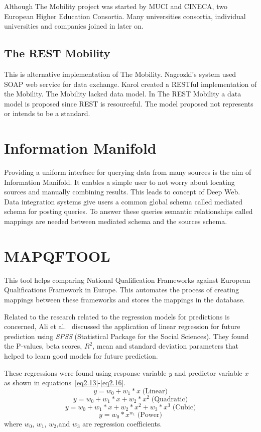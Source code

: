 \documentclass[12pt,a4paper,oneside]{book} %
\begin{document}
    Although The Mobility project was started by MUCI and CINECA, two European Higher Education Consortia. Many universities consortia, individual universities and companies joined in later on.

    \subsection{The REST Mobility}
    This is alternative implementation of The Mobility. Nagrozki's system used SOAP web service for data exchange. Karol created a RESTful implementation of the Mobility. The Mobility lacked data model. In The REST Mobility a data model is proposed since REST is resourceful. The model proposed not represents or intends to be a standard.

\section{Information Manifold}
Providing a uniform interface for querying data from many sources is the aim of Information Manifold. It enables a simple user to not worry about locating sources and manually combining results. This leads to concept of Deep Web. Data integration systems give users a common global schema called mediated schema for posting queries. To answer these queries semantic relationships called mappings are needed between mediated schema and the sources schema.

\section{MAPQFTOOL}
This tool helps comparing National Qualification Frameworks against European Qualifications Framework in Europe. This automates the process of creating mappings between these frameworks and stores the mappings in the database.

Related to the \cite{umair} research related to the regression models for predictions is concerned, Ali et al.~\cite{ali} discussed the application of linear regression for future prediction using {\it SPSS} (Statistical Package for the Social Sciences). They found the P-values, beta scores, $R^2$, mean and standard deviation parameters that helped to learn good models for future prediction.

These regressions were found using response variable $y$ and predictor variable $x$ as shown in equations~\ref{eq2.13}-\ref{eq2.16}.
%
\begin{equation}
  y  =  w_0 + w_1 * x \; \mbox{(Linear)}
  \label{eq2.13}
\end{equation}
%
\begin{equation}
  y = w_0 + w_1 * x + w_2 * x^2 \; \mbox{(Quadratic)}
  \label{eq2.14}
\end{equation}
%
\begin{equation}
  y = w_0 + w_1 * x + w_2 * x^2 + w_3 * x^3 \; \mbox{(Cubic)}
  \label{eq2.15}
\end{equation}
%
\begin{equation}
  y = w_0 * x^{w_1} \; \mbox{(Power)}
  \label{eq2.16}
\end{equation}
%
\noindent where $w_0$, $w_1$, $w_2$,and $w_3$ are regression coefficients.
\end{document}
